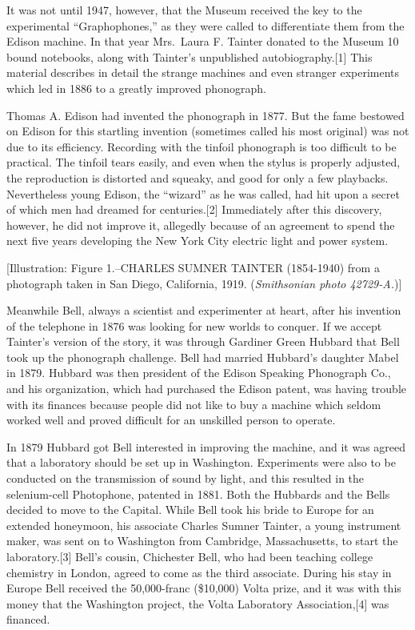 \documentclass[12pt,oneside]{scrbook}
\begin{document}
  It was not until 1947, however, that the Museum received the key to the
  experimental ``Graphophones,'' as they were called to differentiate them
  from the Edison machine. In that year Mrs.~Laura F. Tainter donated to
  the Museum 10 bound notebooks, along with Tainter's unpublished
  autobiography.{[}1{]} This material describes in detail the strange
  machines and even stranger experiments which led in 1886 to a greatly
  improved phonograph.
  
  Thomas A. Edison had invented the phonograph in 1877. But the fame
  bestowed on Edison for this startling invention (sometimes called his
  most original) was not due to its efficiency. Recording with the tinfoil
  phonograph is too difficult to be practical. The tinfoil tears easily,
  and even when the stylus is properly adjusted, the reproduction is
  distorted and squeaky, and good for only a few playbacks. Nevertheless
  young Edison, the ``wizard'' as he was called, had hit upon a secret of
  which men had dreamed for centuries.{[}2{]} Immediately after this
  discovery, however, he did not improve it, allegedly because of an
  agreement to spend the next five years developing the New York City
  electric light and power system.
  
  {[}Illustration: Figure 1.--CHARLES SUMNER TAINTER (1854-1940) from a
  photograph taken in San Diego, California, 1919. (\emph{Smithsonian
  photo 42729-A.}){]}
  
  Meanwhile Bell, always a scientist and experimenter at heart, after his
  invention of the telephone in 1876 was looking for new worlds to
  conquer. If we accept Tainter's version of the story, it was through
  Gardiner Green Hubbard that Bell took up the phonograph challenge. Bell
  had married Hubbard's daughter Mabel in 1879. Hubbard was then president
  of the Edison Speaking Phonograph Co., and his organization, which had
  purchased the Edison patent, was having trouble with its finances
  because people did not like to buy a machine which seldom worked well
  and proved difficult for an unskilled person to operate.
  
  In 1879 Hubbard got Bell interested in improving the machine, and it was
  agreed that a laboratory should be set up in Washington. Experiments
  were also to be conducted on the transmission of sound by light, and
  this resulted in the selenium-cell Photophone, patented in 1881. Both
  the Hubbards and the Bells decided to move to the Capital. While Bell
  took his bride to Europe for an extended honeymoon, his associate
  Charles Sumner Tainter, a young instrument maker, was sent on to
  Washington from Cambridge, Massachusetts, to start the
  laboratory.{[}3{]} Bell's cousin, Chichester Bell, who had been teaching
  college chemistry in London, agreed to come as the third associate.
  During his stay in Europe Bell received the 50,000-franc (\$10,000)
  Volta prize, and it was with this money that the Washington project, the
  Volta Laboratory Association,{[}4{]} was financed.
  
\end{document}
